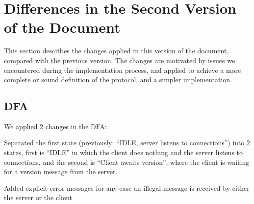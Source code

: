 \section{Differences in the Second Version of the Document}
\label{sec:diff}

This section describes the changes applied in this version of the document, compared with the previous version. The changes are motivated by issues we encountered during the implementation process, and applied to achieve a more complete or sound definition of the protocol, and a simpler implementation.

\subsection{DFA}
We applied 2 changes in the DFA:
\begin{list}
\item Separated the first state (previously: ``IDLE, server listens to connections'') into 2 states, first is ``IDLE'' in which the client does nothing and the server listens to connections, and the second is ``Client awaits version'', where the client is waiting for a version message from the server.
\item Added explicit error messages for any case an illegal message is received by either the server or the client
\end{list}